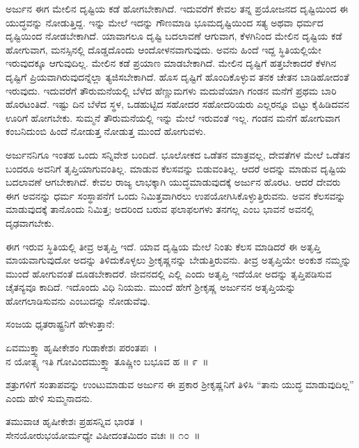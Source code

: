 ಅರ್ಜುನ ಈಗ ಮೇಲಿನ ದೃಷ್ಟಿಯ ಕಡೆ ಹೋಗಬೇಕಾಗಿದೆ. ಇದುವರೆಗೆ ಕೇವಲ ತನ್ನ ಪ್ರಯೋಜನದ ದೃಷ್ಟಿಯಿಂದ ಈ ಯುದ್ಧವನ್ನು ನೋಡುತ್ತಿದ್ದ. ಇನ್ನು ಮೇಲೆ ಇದನ್ನು ಗೌಣಮಾಡಿ ಭೂಮದೃಷ್ಟಿಯಿಂದ ಸತ್ಯ ಅಥವಾ ಧರ್ಮದ ದೃಷ್ಟಿಯಿಂದ ನೋಡಬೇಕಾಗಿದೆ. ಯಾವಾಗಲೂ ದೃಷ್ಟಿ ಬದಲಾವಣೆ ಆಗುವಾಗ, ಕೆಳಗಿನಿಂದ ಮೇಲಿನ ದೃಷ್ಟಿಯ ಕಡೆ ಹೋಗುವಾಗ, ಮನಸ್ಸಿನಲ್ಲಿ ದೊಡ್ಡದೊಂದು ಆಂದೋಳನವಾಗುವುದು. ಅವನು ಹಿಂದೆ ಇದ್ದ ಸ್ಥಿತಿಯಲ್ಲಿಯೇ ಇರುವುದಕ್ಕೂ ಆಗುವುದಿಲ್ಲ. ಮೇಲಿನ ಕಡೆ ಪ್ರಯಾಣ ಮಾಡಬೇಕಾಗಿದೆ. ಮೇಲಿನ ದೃಷ್ಟಿಗೆ ಹತ್ತಬೇಕಾದರೆ ಕೆಳಗಿನ ದೃಷ್ಟಿಗೆ ಪ್ರಿಯವಾಗಿರುವುದನ್ನೆಲ್ಲಾ ತ್ಯಜಿಸಬೇಕಾಗಿದೆ. ಹೊಸ ದೃಷ್ಟಿಗೆ ಹೊಂದಿಕೊಳ್ಳುವ ತನಕ ಚೇತನ ಬಾಡಿಹೋದಂತೆ ಇರುವುದು. ಇದುವರೆಗೆ ತೌರುಮನೆಯಲ್ಲಿ ಬೆಳೆದ ಹೆಣ್ಣು\-ಮಗಳು ಮದುವೆಯಾಗಿ ಗಂಡನ ಮನೆಗೆ ಪ್ರಥಮ ಬಾರಿ ಹೊರಟಂತಿದೆ. ಇಷ್ಟು ದಿನ ಬೆಳೆದ ಸ್ಥಳ, ಒಡಹುಟ್ಟಿದ ಸಹೋದರ ಸಹೋದರಿಯರು ಎಲ್ಲರನ್ನೂ ಬಿಟ್ಟು ಕೈಹಿಡಿದವನ ಊರಿಗೆ ಹೋಗಬೇಕು. ಸುಮ್ಮನೆ ತೌರುಮನೆಯಲ್ಲಿ ಇನ್ನು ಮೇಲೆ ಇರುವಂತೆ ಇಲ್ಲ. ಗಂಡನ ಮನೆಗೆ ಹೋಗುವಾಗ ಕಂಬನಿದುಂಬಿ ಹಿಂದೆ ನೋಡುತ್ತ ನೋಡುತ್ತ ಮುಂದೆ ಹೋಗುವಳು.

ಅರ್ಜುನನಿಗೂ ಇಂತಹ ಒಂದು ಸನ್ನಿವೇಶ ಬಂದಿದೆ. ಭೂಲೋಕದ ಒಡೆತನ ಮಾತ್ರವಲ್ಲ, ದೇವತೆಗಳ ಮೇಲೆ ಒಡೆತನ ಬಂದರೂ ಅವನಿಗೆ ತೃಪ್ತಿಯಾಗುವಂತಿಲ್ಲ. ಮಾಡುವ ಕೆಲಸವನ್ನು ಬಿಡುವಂತಿಲ್ಲ. ಆದರೆ ಅದನ್ನು ಮಾಡುವ ದೃಷ್ಟಿಯ ಬದಲಾವಣೆ ಆಗಬೇಕಾಗಿದೆ. ಕೇವಲ ರಾಜ್ಯ ಲಾಭಕ್ಕಾಗಿ ಯುದ್ಧಮಾಡುವುದಕ್ಕೆ ಅರ್ಜುನ ಹೊರಟ. ಆದರೆ ದೇವರು ಈಗ ಅವನನ್ನು ಧರ್ಮ ಸಂಸ್ಥಾಪನೆಗೆ ಒಂದು ನಿಮಿತ್ತವಾಗಿರಲು ಉಪಯೋಗಿಸಿಕೊಳ್ಳುತ್ತಿರುವನು. ಅವನ ಕೆಲಸವನ್ನು ಮಾಡುವುದಕ್ಕೆ ತಾನೊಂದು ನಿಮಿತ್ತ; ಅದರಿಂದ ಬರುವ ಫಲಾಫಲಗಳು ತನಗಲ್ಲ ಎಂಬ ಭಾವನೆ ಅವನಲ್ಲಿ ದೃಢವಾಗಬೇಕು.

ಈಗ ಇರುವ ಸ್ಥಿತಿಯಲ್ಲಿ ತೀವ್ರ ಅತೃಪ್ತಿ ಇದೆ. ಯಾವ ದೃಷ್ಟಿಯ ಮೇಲೆ ನಿಂತು ಕೆಲಸ ಮಾಡಿದರೆ ಈ ಅತೃಪ್ತಿ ಮಾಯವಾಗುವುದೋ ಅದನ್ನು ತಿಳಿದುಕೊಳ್ಳಲು ಶ‍್ರೀಕೃಷ್ಣನನ್ನು ಬೇಡು\-ತ್ತಿರುವನು. ತೀವ್ರ ಅತೃಪ್ತಿಯೇ ಅಂಕುಶ ನಮ್ಮನ್ನು ಮುಂದೆ ಹೋಗುವಂತೆ ದೂಡಬೇಕಾದರೆ. ಜೀವನದಲ್ಲಿ ಎಲ್ಲಿ ಎಂದು ಅತೃಪ್ತಿ ಇದೆಯೋ ಅದನ್ನು ತೃಪ್ತಿಪಡಿಸುವ ಚೈತನ್ಯವೂ ಕಾದಿದೆ. ಇದೊಂದು ವಿಧಿ ನಿಯಮ. ಮುಂದೆ ಹೇಗೆ ಶ‍್ರೀಕೃಷ್ಣ ಅರ್ಜುನನ ಅತೃಪ್ತಿಯನ್ನು ಹೋಗ\-ಲಾಡಿಸುವನು ಎಂಬುದನ್ನು ನೋಡುವೆವು.

ಸಂಜಯ ಧೃತರಾಷ್ಟ್ರನಿಗೆ ಹೇಳುತ್ತಾನೆ:

\begin{shloka}
ಏವಮುಕ್ತ್ವಾ ಹೃಷೀಕೇಶಂ ಗುಡಾಕೇಶಃ ಪರಂತಪಃ~।\\ನ ಯೋತ್ಸ್ಯ ಇತಿ ಗೋವಿಂದಮುಕ್ತ್ವಾ ತೂಷ್ಣೀಂ ಬಭೂವ ಹ \hfill॥ ೯~॥
\end{shloka}

\begin{artha}
ಶತ್ರುಗಳಿಗೆ ಸಂತಾಪವನ್ನು ಉಂಟುಮಾಡುವ ಅರ್ಜುನ ಈ ಪ್ರಕಾರ ಶ‍್ರೀಕೃಷ್ಣನಿಗೆ ತಿಳಿಸಿ “ತಾನು ಯುದ್ಧ ಮಾಡುವುದಿಲ್ಲ” ಎಂದು ಹೇಳಿ ಸುಮ್ಮನಾದನು.
\end{artha}

\begin{shloka}
ತಮುವಾಚ ಹೃಷೀಕೇಶಃ ಪ್ರಹಸನ್ನಿವ ಭಾರತ~।\\ಸೇನಯೋರುಭಯೋರ್ಮಧ್ಯೇ ವಿಷೀದಂತಮಿದಂ ವಚಃ \hfill॥ ೧೦~॥
\end{shloka}


